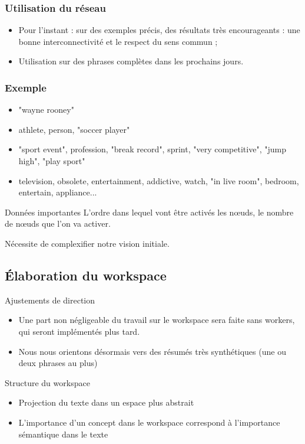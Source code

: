 \documentclass{beamer}
\begin{document}
\begin{frame}
\frametitle{Utilisation du réseau}

\begin{itemize}
 \item Pour l'instant : sur des exemples précis, des résultats très encourageants : une bonne interconnectivité et le respect du sens commun ;
 \item Utilisation sur des phrases complètes dans les prochains jours.
\end{itemize}

\end{frame}


\begin{frame}
\frametitle{Exemple}

\begin{itemize}
 \item "wayne rooney"
 \item athlete, person, "soccer player"
 \item "sport event", profession, "break record", sprint, "very competitive", "jump high", "play sport"
 \item television, obsolete, entertainment, addictive, watch, "in live room", bedroom, entertain, appliance...
\end{itemize}

\begin{block}{Données importantes}
L'ordre dans lequel vont être activés les n\oe uds, le nombre de n\oe uds que l'on va activer.

Nécessite de complexifier notre vision initiale.
\end{block}


\end{frame}


\subsection{Élaboration du workspace}
\begin{frame}
  \begin{block}{Ajustements de direction}
    \begin{itemize}
      \item Une part non négligeable du travail sur le workspace sera faite sans workers, qui seront implémentés plus tard.
      \item Nous nous orientons désormais vers des résumés très synthétiques (une ou deux phrases au plus)
    \end{itemize}
  \end{block}

  \begin{block}{Structure du workspace}
   \begin{itemize}
     \item Projection du texte dans un espace plus abstrait
     \item L'importance d'un concept dans le workspace correspond à l'importance sémantique dans le texte
   \end{itemize} 
  \end{block}
\end{frame}
\end{document}
